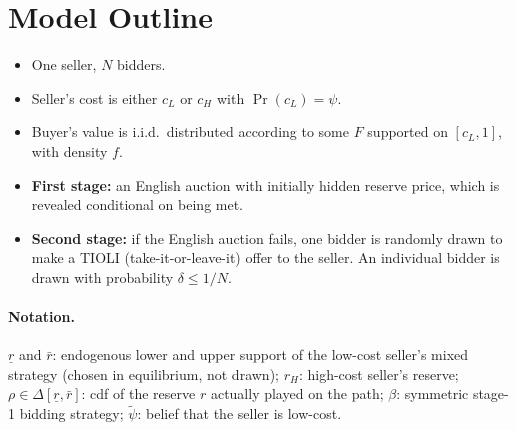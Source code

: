 \section{Model Outline}
\label{sec:model}

\begin{itemize}[leftmargin=*]
  \item One seller, $N$ bidders.
  \item Seller's cost is either $c_L$ or $c_H$ with $\Pr(c_L) = \psi$.
  \item Buyer's value is i.i.d.\ distributed according to some $F$ supported on
    $[c_L, 1]$, with density $f$.
  \item \textbf{First stage:} an English auction with initially hidden reserve
    price, which is revealed conditional on being met.
  \item \textbf{Second stage:} if the English auction fails, one bidder is
    randomly drawn to make a TIOLI (take-it-or-leave-it) offer to the seller.
    An individual bidder is drawn with probability $\delta \le 1/N$.
\end{itemize}

\paragraph{Notation.}
$\underline{r}$ and $\bar{r}$: endogenous lower and upper support of the
low-cost seller's mixed strategy (chosen in equilibrium, not drawn);
$r_H$: high-cost seller's reserve;
$\rho \in \Delta[\underline{r}, \bar{r}]$: cdf of the reserve $r$ actually
played on the path;
$\beta$: symmetric stage-1 bidding strategy; $\tilde{\psi}$: belief that the
seller is low-cost.

